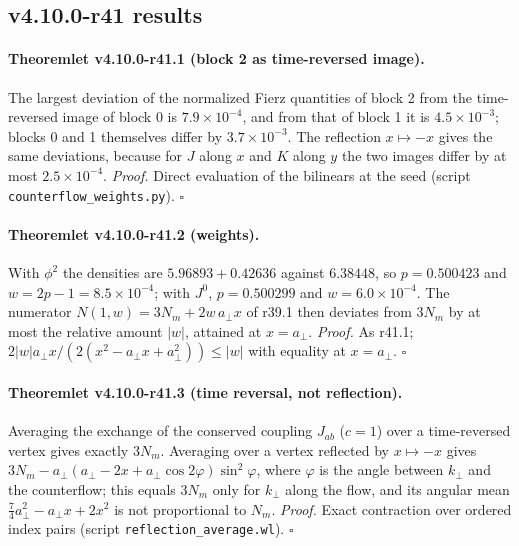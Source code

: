 \subsection*{v4.10.0-r41 results}
\label{subsec:v4100-r41-results}

\paragraph{Theoremlet v4.10.0-r41.1 (block 2 as time-reversed image).}
The largest deviation of the normalized Fierz quantities of block 2 from the time-reversed image of block 0 is \(7.9\times10^{-4}\), and from that of
block 1 it is \(4.5\times10^{-3}\); blocks 0 and 1 themselves differ by \(3.7\times10^{-3}\).  The reflection \(x\mapsto-x\) gives the same deviations, because
for \(J\) along \(x\) and \(K\) along \(y\) the two images differ by at most \(2.5\times10^{-4}\).
\emph{Proof.} Direct evaluation of the bilinears at the seed (script \texttt{counterflow\_\allowbreak weights.py}).  \(\square\)

\paragraph{Theoremlet v4.10.0-r41.2 (weights).}
With \(\phi^2\) the densities are \(5.96893+0.42636\) against \(6.38448\), so \(p=0.500423\) and \(w=2p-1=8.5\times10^{-4}\); with \(J^0\), \(p=0.500299\) and
\(w=6.0\times10^{-4}\).  The numerator \(N(1,w)=3N_m+2w\,a_\perp x\) of r39.1 then deviates from \(3N_m\) by at most the relative amount \(|w|\), attained at
\(x=a_\perp\).
\emph{Proof.} As r41.1; \(2|w|a_\perp x/(2(x^2-a_\perp x+a_\perp^2))\le|w|\) with equality at \(x=a_\perp\).  \(\square\)

\paragraph{Theoremlet v4.10.0-r41.3 (time reversal, not reflection).}
Averaging the exchange of the conserved coupling \(J_{ab}\) (\(c=1\)) over a time-reversed vertex gives exactly \(3N_m\).  Averaging over a vertex reflected
by \(x\mapsto-x\) gives \(3N_m-a_\perp(a_\perp-2x+a_\perp\cos2\varphi)\sin^2\varphi\), where \(\varphi\) is the angle between \(k_\perp\) and the counterflow; this
equals \(3N_m\) only for \(k_\perp\) along the flow, and its angular mean \(\tfrac74a_\perp^2-a_\perp x+2x^2\) is not proportional to \(N_m\).
\emph{Proof.} Exact contraction over ordered index pairs (script \texttt{reflection\_\allowbreak average.wl}).  \(\square\)

